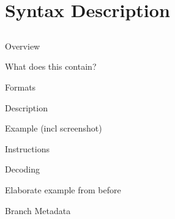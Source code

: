 \section{Syntax Description}
\subsection{}

\begin{frame}{Overview}

What does this contain?

\end{frame}

\begin{frame}{Formats}

Description

Example (incl screenshot)

\end{frame}

\begin{frame}{Instructions}
\end{frame}

\begin{frame}{Decoding}

Elaborate example from before

\end{frame}

\begin{frame}{Branch Metadata}



\end{frame}
